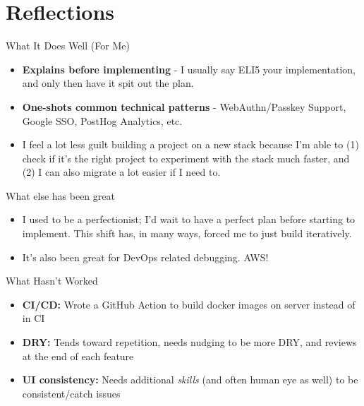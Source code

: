 \documentclass{beamer}
\begin{document}
\section{Reflections}

\begin{frame}{What It Does Well (For Me)}
    \begin{itemize}[<+->]
        \item \textbf{Explains before implementing} - I usually say ELI5 your implementation, and only then have it spit out the plan.
        \item \textbf{One-shots common technical patterns} - WebAuthn/Passkey Support, Google SSO, PostHog Analytics, etc.
        \item I feel a lot less guilt building a project on a new stack because I'm able to (1) check if it's the right project to experiment with the stack much faster, and (2) I can also migrate a lot easier if I need to.
    \end{itemize}
\end{frame}

\begin{frame}{What else has been great}
    \begin{itemize}[<+->]
        \item I used to be a perfectionist; I'd wait to have a perfect plan before starting to implement. This shift has, in many ways, forced me to just build iteratively.
        \item It's also been great for DevOps related debugging. AWS!
    \end{itemize}
\end{frame}

\begin{frame}{What Hasn't Worked}
    \begin{itemize}[<+->]
        \item \textbf{CI/CD:} Wrote a GitHub Action to build docker images on server instead of in CI
        \item \textbf{DRY:} Tends toward repetition, needs nudging to be more DRY, and reviews at the end of each feature
        \item \textbf{UI consistency:} Needs additional \textit{skills} (and often human eye as well) to be consistent/catch issues
    \end{itemize}
\end{frame}
\end{document}
